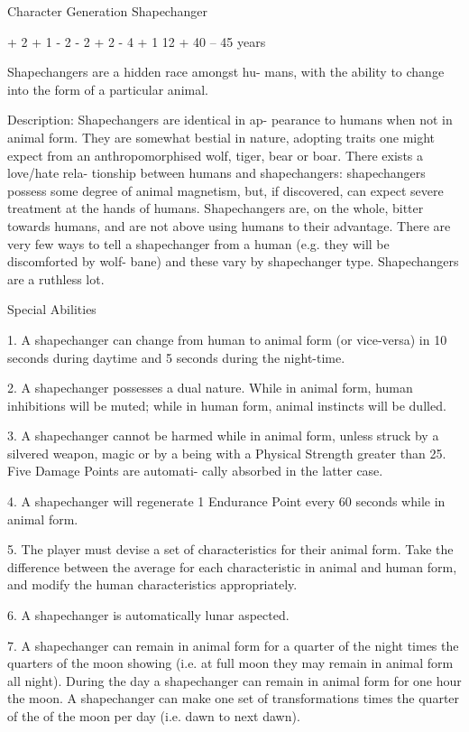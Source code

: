 \begin{Chapter}{Character Generation}
Shapechanger 

+ 2 
+ 1 
- 2 
- 2 
+ 2 
- 4 
+ 1 
12 +  
40 – 45 years 

Shapechangers  are  a  hidden  race  amongst  hu-
mans, with the ability to change into the form of 
a particular animal. 

Description:  Shapechangers  are  identical  in  ap-
pearance to humans when not in animal form. They 
are somewhat bestial in nature, adopting traits one 
might  expect  from  an  anthropomorphised  wolf, 
tiger,  bear  or  boar.  There  exists  a  love/hate  rela-
tionship  between  humans  and  shapechangers: 
shapechangers  possess  some  degree  of  animal 
magnetism,  but,  if  discovered,  can  expect  severe 
treatment  at  the  hands  of  humans.  Shapechangers 
are,  on  the  whole,  bitter  towards  humans,  and  are 
not  above  using  humans  to  their  advantage.  There 
are  very  few  ways  to  tell  a  shapechanger  from  a 
human  (e.g.  they  will  be  discomforted  by  wolf-
bane)  and  these  vary  by  shapechanger  type. 
Shapechangers are a ruthless lot. 

Special Abilities 

1.  A  shapechanger  can  change  from  human  to 
animal  form  (or  vice-versa)  in  10  seconds  during 
daytime and 5 seconds during the night-time. 

2.  A  shapechanger  possesses  a  dual  nature.  While 
in  animal  form,  human  inhibitions  will  be  muted; 
while  in  human  form,  animal  instincts  will  be 
dulled. 

3.  A  shapechanger  cannot  be  harmed  while  in 
animal  form,  unless  struck  by  a  silvered  weapon, 
magic  or  by  a  being  with  a  Physical  Strength 
greater than 25. Five Damage Points are automati-
cally absorbed in the latter case. 

4.  A  shapechanger  will  regenerate  1  Endurance 
Point every 60 seconds while in animal form. 

5.  The  player  must  devise  a  set  of  characteristics 
for their animal form. Take the difference between 
the  average  for  each  characteristic  in  animal  and 
human form, and modify the human characteristics 
appropriately. 

6. A shapechanger is automatically lunar aspected. 

7. A shapechanger can remain in animal form for a 
quarter of the night times the quarters of the moon 
showing  (i.e.  at  full  moon  they  may  remain  in 
animal  form  all  night).  During 
the  day  a 
shapechanger  can  remain  in  animal  form  for  one 
hour 
the  moon.  A 
shapechanger can make one set of transformations 
times  the  quarter  of  the  of  the  moon  per  day  (i.e. 
dawn to next dawn). 


\end{Chapter}
